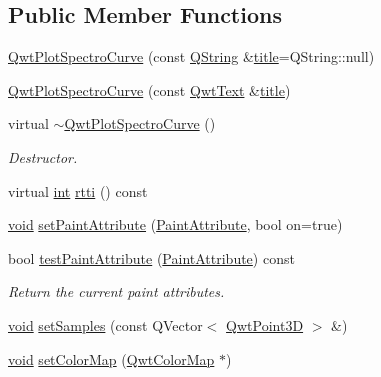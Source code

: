 \subsection*{Public Member Functions}
\begin{DoxyCompactItemize}
\item 
\hyperlink{class_qwt_plot_spectro_curve_aa02c00eb35a6f08ab11091ef66c737cd}{Qwt\-Plot\-Spectro\-Curve} (const \hyperlink{group___u_a_v_objects_plugin_gab9d252f49c333c94a72f97ce3105a32d}{Q\-String} \&\hyperlink{class_qwt_plot_item_a3859d011b670b5f89e45d1ccef9206f7}{title}=Q\-String\-::null)
\item 
\hyperlink{class_qwt_plot_spectro_curve_a78170049ecb2b6681a107abf26783bd7}{Qwt\-Plot\-Spectro\-Curve} (const \hyperlink{class_qwt_text}{Qwt\-Text} \&\hyperlink{class_qwt_plot_item_a3859d011b670b5f89e45d1ccef9206f7}{title})
\item 
virtual \hyperlink{class_qwt_plot_spectro_curve_a8246490aaa9d47e77f5596f56fb073d6}{$\sim$\-Qwt\-Plot\-Spectro\-Curve} ()
\begin{DoxyCompactList}\small\item\em Destructor. \end{DoxyCompactList}\item 
virtual \hyperlink{ioapi_8h_a787fa3cf048117ba7123753c1e74fcd6}{int} \hyperlink{class_qwt_plot_spectro_curve_a5e866a7b7c024d26329814745ca2379c}{rtti} () const 
\item 
\hyperlink{group___u_a_v_objects_plugin_ga444cf2ff3f0ecbe028adce838d373f5c}{void} \hyperlink{class_qwt_plot_spectro_curve_a3a2ddc8e46bc4414b5ce104e7c70f9b4}{set\-Paint\-Attribute} (\hyperlink{class_qwt_plot_spectro_curve_af6d4c6ae392f3f521db710484a059625}{Paint\-Attribute}, bool on=true)
\item 
bool \hyperlink{class_qwt_plot_spectro_curve_abd7f7eb2830b0dfb7f6211f0b252088e}{test\-Paint\-Attribute} (\hyperlink{class_qwt_plot_spectro_curve_af6d4c6ae392f3f521db710484a059625}{Paint\-Attribute}) const 
\begin{DoxyCompactList}\small\item\em Return the current paint attributes. \end{DoxyCompactList}\item 
\hyperlink{group___u_a_v_objects_plugin_ga444cf2ff3f0ecbe028adce838d373f5c}{void} \hyperlink{class_qwt_plot_spectro_curve_a668926af2266515a5d82911ac81262ca}{set\-Samples} (const Q\-Vector$<$ \hyperlink{class_qwt_point3_d}{Qwt\-Point3\-D} $>$ \&)
\item 
\hyperlink{group___u_a_v_objects_plugin_ga444cf2ff3f0ecbe028adce838d373f5c}{void} \hyperlink{class_qwt_plot_spectro_curve_a67d046af16feeddc9bec08c698b46446}{set\-Color\-Map} (\hyperlink{class_qwt_color_map}{Qwt\-Color\-Map} $\ast$)

\end{DoxyCompactItemize}
